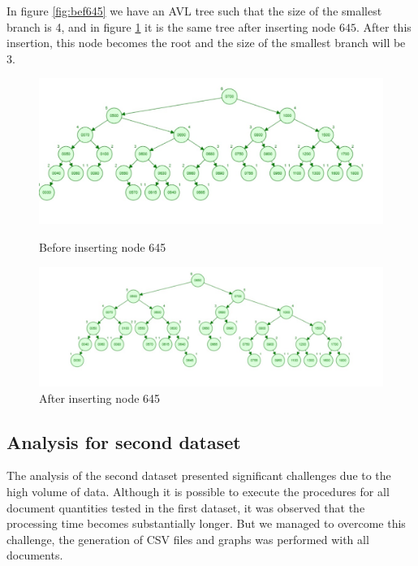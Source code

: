  In figure \ref{fig:bef645} we have an AVL tree such that the size of the smallest branch is 4, and in figure
 \ref{fig:af645} it is the same tree after inserting node $645$. After this insertion,
 this node becomes the root and the size of the smallest branch will be 3.

 \begin{figure}[H]
     \centering
     \begin{minipage}{0.46\linewidth}
         \centering
         \includegraphics[width=\linewidth]{img/avl_before.jpeg}
         \caption{Before inserting node 645}
         \label{fig:bef645}
     \end{minipage}
     \hfill
     \begin{minipage}{0.48\linewidth}
         \centering
         \includegraphics[width=\linewidth]{img/avl_after.jpeg}
         \caption{After inserting node 645}
         \label{fig:af645}
     \end{minipage}
 \end{figure}

 \subsection{Analysis for second dataset}

 The analysis of the second dataset presented significant challenges due to the high volume of data.
 Although it is possible to execute the procedures for all document quantities tested in the first dataset,
 it was observed that the processing time becomes substantially longer.
 But we managed to overcome this challenge, the generation of CSV files and graphs was performed with all documents.


